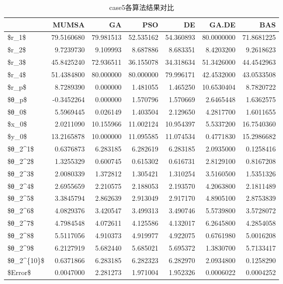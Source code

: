 \documentclass[]{ctexbook}
\theoremstyle{definition}
\theoremstyle{definition}
\theoremstyle{definition}
\theoremstyle{remark}
\begin{document}
\begin{table}

\caption{\label{tab:case5table}case5各算法结果对比}
\centering
\begin{tabular}[t]{lrrrrrr}
\toprule
  & MUMSA & GA & PSO & DE & GA.DE & BAS\\
\midrule
\$r\_1\$ & 79.5160680 & 79.981513 & 52.535162 & 54.360893 & 80.0000000 & 71.8681225\\
\$r\_2\$ & 9.7239730 & 9.109993 & 8.687886 & 8.683351 & 8.4203200 & 9.2618623\\
\$r\_3\$ & 45.8425240 & 72.936511 & 36.155078 & 34.318634 & 51.3426000 & 44.4542963\\
\$r\_4\$ & 51.4384800 & 80.000000 & 80.000000 & 79.996171 & 42.4532000 & 43.0533508\\
\$r\_p\$ & 8.7289390 & 0.000000 & 1.481055 & 1.465250 & 10.6530404 & 8.7820722\\
\addlinespace
\$θ\_p\$ & -0.3452264 & 0.000000 & 1.570796 & 1.570669 & 2.6465448 & 1.6362575\\
\$θ\_0\$ & 5.5969445 & 0.026149 & 1.403504 & 2.129650 & 4.2817700 & 1.6011655\\
\$x\_0\$ & 2.0211090 & 10.155966 & 11.002124 & 10.954397 & 5.5337200 & 16.7540360\\
\$y\_0\$ & 13.2165878 & 10.000000 & 11.095585 & 11.074534 & 0.4771830 & 15.2986682\\
\$θ\_2\textasciicircum{}1\$ & 0.6376873 & 6.283185 & 6.282619 & 6.283185 & 2.0935000 & 0.1258416\\
\addlinespace
\$θ\_2\textasciicircum{}2\$ & 1.3255329 & 0.600745 & 0.615302 & 0.616731 & 2.8129100 & 0.8167208\\
\$θ\_2\textasciicircum{}3\$ & 2.0080339 & 1.372812 & 1.305421 & 1.310254 & 3.5160500 & 1.5351326\\
\$θ\_2\textasciicircum{}4\$ & 2.6955659 & 2.210575 & 2.188053 & 2.193570 & 4.2063800 & 2.1811489\\
\$θ\_2\textasciicircum{}5\$ & 3.3845794 & 2.862639 & 2.913049 & 2.917170 & 4.8905100 & 2.8753839\\
\$θ\_2\textasciicircum{}6\$ & 4.0829376 & 3.420547 & 3.499313 & 3.490746 & 5.5739800 & 3.5728072\\
\addlinespace
\$θ\_2\textasciicircum{}7\$ & 4.7984548 & 4.072611 & 4.125586 & 4.132017 & 6.2645800 & 4.2854058\\
\$θ\_2\textasciicircum{}8\$ & 5.5117056 & 4.910373 & 4.919977 & 4.922075 & 0.6761980 & 5.0016208\\
\$θ\_2\textasciicircum{}9\$ & 6.2127919 & 5.682440 & 5.685021 & 5.695372 & 1.3830700 & 5.7133417\\
\$θ\_2\textasciicircum{}\{10\}\$ & 0.6371866 & 6.283185 & 6.282323 & 6.282970 & 2.0934800 & 0.1258290\\
\$Error\$ & 0.0047000 & 2.281273 & 1.971004 & 1.952326 & 0.0006022 & 0.0004252\\
\bottomrule
\end{tabular}
\end{table}
\end{document}
